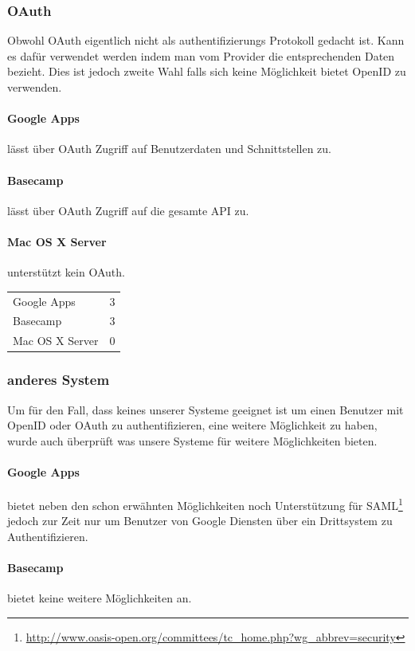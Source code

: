 \subsubsection{OAuth}
\label{ssub:Bewertung OAuth}
Obwohl OAuth eigentlich nicht als authentifizierungs Protokoll gedacht ist. Kann es dafür verwendet werden indem man vom Provider die entsprechenden Daten bezieht. Dies ist jedoch zweite Wahl falls sich keine Möglichkeit bietet OpenID zu verwenden.
\paragraph{Google Apps}
\label{par:2.2Google Apps}
lässt über OAuth Zugriff auf Benutzerdaten und Schnittstellen zu.
\paragraph{Basecamp}
\label{par:2.2Basecamp}
lässt über OAuth Zugriff auf die gesamte API zu.
\paragraph{Mac OS X Server}
\label{par:2.2Mac OS X Server}
unterstützt kein OAuth.

\begin{tabular}{lc}
Google Apps & 3\\
Basecamp & 3\\
Mac OS X Server & 0\\
\end{tabular}

\subsubsection{anderes System}
\label{ssub:anderes System}
Um für den Fall, dass keines unserer Systeme geeignet ist um einen Benutzer mit OpenID oder OAuth zu authentifizieren, eine weitere Möglichkeit zu haben, wurde auch überprüft was unsere Systeme für weitere Möglichkeiten bieten.
\paragraph{Google Apps}
\label{par:2.3Google Apps}
bietet neben den schon erwähnten Möglichkeiten noch Unterstützung für SAML\footnote{\url{http://www.oasis-open.org/committees/tc_home.php?wg_abbrev=security}} jedoch zur Zeit nur um Benutzer von Google Diensten über ein Drittsystem zu Authentifizieren.
\paragraph{Basecamp}
\label{par:2.3Basecamp}
bietet keine weitere Möglichkeiten an.
